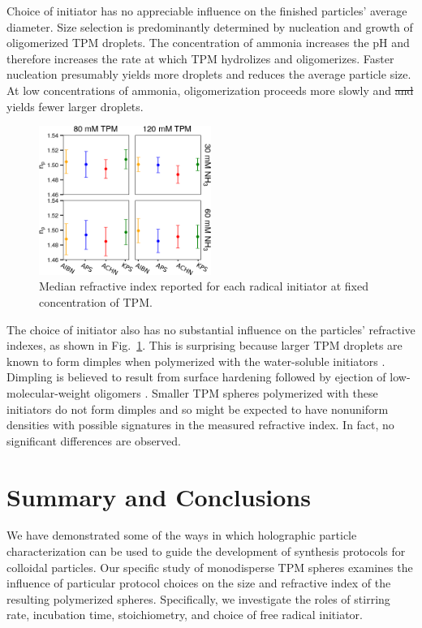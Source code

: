 \documentclass[journal=langd5,manuscript=article]{achemso}
\providecommand{\DIFdel}[1]{{\protect\color{red}\sout{#1}}}                      %
\providecommand{\DIFdelbegin}{} %
\providecommand{\DIFdelend}{} %
\begin{document}
Choice of initiator has no appreciable 
influence on the finished particles'
average diameter.
Size selection is predominantly 
determined by nucleation and growth of
oligomerized TPM droplets.
The concentration of ammonia increases the pH and
therefore increases the rate at which TPM hydrolizes and oligomerizes.
Faster nucleation
presumably yields more droplets and reduces the average particle size.
At low concentrations of ammonia, 
oligomerization proceeds more slowly
and \DIFdelbegin \DIFdel{and }\DIFdelend yields fewer larger droplets.

\begin{figure}
    \centering
    \includegraphics[width=0.5\textwidth]{longitudinal_np_02}
    \caption{Median refractive index reported for each radical initiator
    at fixed concentration of TPM.}
    \label{fig:longitudinal_np}
\end{figure}

The choice of initiator also has no substantial
influence on the particles' refractive indexes,
as shown in Fig.~\ref{fig:longitudinal_np}.
This is surprising because
larger TPM droplets are known to form dimples when polymerized
with the water-soluble initiators \cite{sacanna11}.
Dimpling is believed to result from
surface hardening followed by
ejection of low-molecular-weight oligomers \cite{sacanna11}.
Smaller TPM spheres polymerized with these
initiators do not form dimples and so might 
be expected to have nonuniform densities
with possible signatures in the measured refractive
index.  In fact, no significant differences are observed.

\section{Summary and Conclusions}
\label{sec:discussion}

We have demonstrated some of the ways in which 
holographic particle characterization
can be used to guide the development of synthesis
protocols for colloidal particles.
Our specific study of monodisperse TPM spheres
examines the influence of particular protocol
choices on the size and refractive index of 
the resulting polymerized spheres. Specifically,
we investigate the roles of stirring rate, 
incubation time, stoichiometry, and choice of
free radical initiator.
\end{document}

